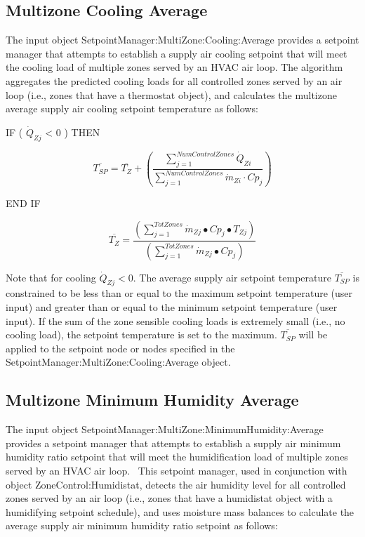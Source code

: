 \subsection{Multizone Cooling Average}\label{multizone-cooling-average}

The input object SetpointManager:MultiZone:Cooling:Average provides a setpoint manager that attempts to establish a supply air cooling setpoint that will meet the cooling load of multiple zones served by an HVAC air loop. The algorithm aggregates the predicted cooling loads for all controlled zones served by an air loop (i.e., zones that have a thermostat object), and calculates the multizone average supply air cooling setpoint temperature as follows:

IF ( \({\dot Q_{Zj}}\) \textless{} 0 ) THEN

\begin{equation}
\overline {{T_{SP}}}  = \overline {{T_Z}}  + \left( {\frac{{\sum\limits_{j = 1}^{NumControlZones} {{{\dot Q}_{Zi}}} }}{{\sum\limits_{j = 1}^{NumControlZones} {{{\dot m}_{Zi}}\cdot C{p_j}} }}} \right)
\end{equation}

END IF

\begin{equation}
{\overline{T_Z}} = {\frac{{\left( {\sum\limits_{j = 1}^{TotZones} {{{\dot m}_{Zj}} \bullet } C{p_j} \bullet {T_{Zj}}} \right)}}{\left( {\sum\limits_{j = 1}^{TotZones} {{{\dot m}_{Zj}} \bullet } C{p_j}} \right)}}
\end{equation}

Note that for cooling \({\dot Q_{Zj}} < 0.\) The average supply air setpoint temperature \({\overline{T_{SP}}}\) is constrained to be less than or equal to the maximum setpoint temperature (user input) and greater than or equal to the minimum setpoint temperature (user input). If the sum of the zone sensible cooling loads is extremely small (i.e., no cooling load), the setpoint temperature is set to the maximum. \({\overline{T_{SP}}}\) will be applied to the setpoint node or nodes specified in the SetpointManager:MultiZone:Cooling:Average object.

\subsection{Multizone Minimum Humidity Average}\label{multizone-minimum-humidity-average}

The input object SetpointManager:MultiZone:MinimumHumidity:Average provides a setpoint manager that attempts to establish a supply air minimum humidity ratio setpoint that will meet the humidification load of multiple zones served by an HVAC air loop.~ This setpoint manager, used in conjunction with object ZoneControl:Humidistat, detects the air humidity level for all controlled zones served by an air loop (i.e., zones that have a humidistat object with a humidifying setpoint schedule), and uses moisture mass balances to calculate the average supply air minimum humidity ratio setpoint as follows:

